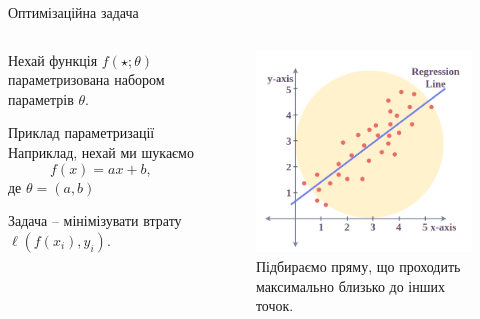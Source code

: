 \documentclass{zkdl-presentation-template}
\begin{document}
    \begin{frame}{Оптимізаційна задача}
        \begin{columns}
            \begin{column}{0.5\textwidth}
                Нехай функція $f(\star;\theta)$ параметризована набором параметрів $\theta$. 

                \begin{exampleblock}{Приклад параметризації}
                    Наприклад, нехай ми шукаємо
                    \begin{equation*}
                        f(x) = a x + b,
                    \end{equation*}
                    де $\theta=(a,b)$
                \end{exampleblock}

                Задача -- мінімізувати втрату $\ell(f(x_i),y_i)$.
            \end{column}
            \begin{column}{0.5\textwidth}
                \begin{figure}
                    \centering
                    \includegraphics[width=\textwidth]{images/regression.png}
                    \caption{Підбираємо пряму, що проходить максимально близько до інших точок.}
                \end{figure}
            \end{column}
        \end{columns}
    \end{frame}
    
\end{document}
